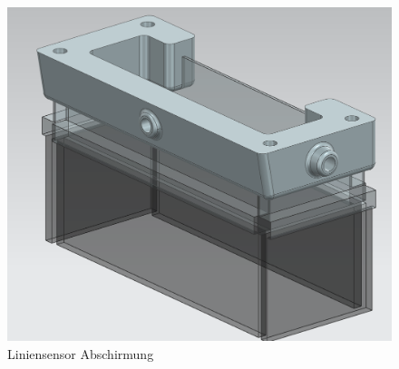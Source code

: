 \begin{figure}[H]
 
\end{figure}
\newpage

\begin{figure}[H]
\centering
\begin{minipage}[b]{0.45\textwidth}
  \centering
    \includegraphics[width=\textwidth]{assets//MT/Sensor Abdeckung.png}
    \caption{Liniensensor Abschirmung}
    \label{fig:Liniensensor Abdeckung}
\end{minipage}
\hspace{0.05\textwidth} %
\begin{minipage}[b]{0.45\textwidth}
  \centering

\end{minipage}
\end{figure}
